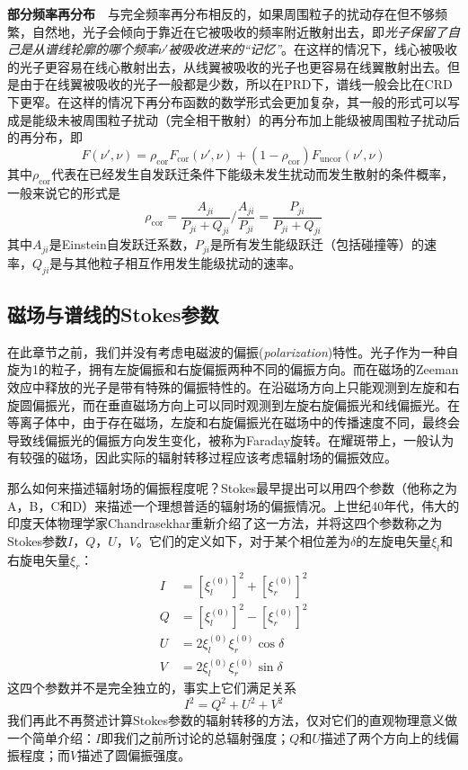 \noindent
\textbf{部分频率再分布}\ \ 与完全频率再分布相反的，如果周围粒子的扰动存在但不够频繁，自然地，光子会倾向于靠近在它被吸收的频率附近散射出去，即\emph{光子保留了自己是从谱线轮廓的哪个频率$\nu'$被吸收进来的“记忆”}。在这样的情况下，线心被吸收的光子更容易在线心散射出去，从线翼被吸收的光子也更容易在线翼散射出去。但是由于在线翼被吸收的光子一般都是少数，所以在PRD下，谱线一般会比在CRD下更窄。在这样的情况下再分布函数的数学形式会更加复杂，其一般的形式可以写成是能级未被周围粒子扰动（完全相干散射）的再分布加上能级被周围粒子扰动后的再分布，即\parencites{Mihalas2014}
\begin{equation}
	F(\nu',\nu) = \rho_{\mathrm{cor}}F_{\mathrm{cor}}(\nu',\nu) + (1 - \rho_{\mathrm{cor}})F_{\mathrm{uncor}}(\nu',\nu)
\end{equation}
其中$\rho_{\mathrm{cor}}$代表在已经发生自发跃迁条件下能级未发生扰动而发生散射的条件概率，一般来说它的形式是\parencites{Mihalas2014}
\begin{equation}
	\rho_{\mathrm{cor}} = \frac{A_{ji}}{P_{ji} + Q_{ji}}\bigg/\frac{A_{ji}}{P_{ji}} = \frac{P_{ji}}{P_{ji} + Q_{ji}}
\end{equation}
其中$A_{ji}$是Einstein自发跃迁系数，$P_{ji}$是所有发生能级跃迁（包括碰撞等）的速率，$Q_{ji}$是与其他粒子相互作用发生能级扰动的速率。
\subsection{磁场与谱线的Stokes参数}
在此章节之前，我们并没有考虑电磁波的偏振(\textit{polarization})特性。光子作为一种自旋为1的粒子，拥有左旋偏振和右旋偏振两种不同的偏振方向。而在磁场的Zeeman效应中释放的光子是带有特殊的偏振特性的。在沿磁场方向上只能观测到左旋和右旋圆偏振光，而在垂直磁场方向上可以同时观测到左旋右旋偏振光和线偏振光。在等离子体中，由于存在磁场，左旋和右旋偏振光在磁场中的传播速度不同，最终会导致线偏振光的偏振方向发生变化，被称为Faraday旋转。在耀斑带上，一般认为有较强的磁场，因此实际的辐射转移过程应该考虑辐射场的偏振效应。

那么如何来描述辐射场的偏振程度呢？Stokes最早提出可以用四个参数（他称之为A，B，C和D）来描述一个理想普适的辐射场的偏振情况。上世纪40年代，伟大的印度天体物理学家Chandrasekhar重新介绍了这一方法，并将这四个参数称之为Stokes参数$I$，$Q$，$U$，$V$\parencites{Rybicki1996}。它们的定义如下，对于某个相位差为$\delta$的左旋电矢量$\xi_{l}$和右旋电矢量$\xi_{r}$\parencites{Chandrasekhar1947}：
\begin{align}
	I &= \left[\xi_{l}^{(0)}\right]^{2}+\left[\xi_{r}^{(0)}\right]^{2} \\
	Q &= \left[\xi_{l}^{(0)}\right]^{2}-\left[\xi_{r}^{(0)}\right]^{2} \\
	U &= 2 \xi_{l}^{(0)} \xi_{r}^{(0)} \cos \delta \\
	V &= 2 \xi_{l}^{(0)} \xi_{r}^{(0)} \sin \delta
\end{align}
这四个参数并不是完全独立的，事实上它们满足关系
\begin{equation}
	I^2=Q^{2}+U^{2}+V^{2}
\end{equation}
我们再此不再赘述计算Stokes参数的辐射转移的方法，仅对它们的直观物理意义做一个简单介绍：$I$即我们之前所讨论的总辐射强度；$Q$和$U$描述了两个方向上的线偏振程度；而$V$描述了圆偏振强度。

